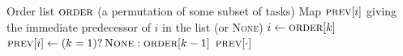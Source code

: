 \begin{algorithm}[!htbp]
\caption{BuildPrevMap (Helper for hard ordered schedules)}
\label{alg:build_prev_map}
\scriptsize
\begin{algorithmic}[1]
\Require Order list $\textsc{order}$ (a permutation of some subset of tasks)
\Ensure Map $\textsc{prev}[i]$ giving the immediate predecessor of $i$ in the list (or \textsc{None})
    \State $i\gets \textsc{order}[k]$
    \State $\textsc{prev}[i]\gets (k=1)?\,\textsc{None}:\textsc{order}[k-1]$
\EndFor
\State \Return $\textsc{prev}[\cdot]$
\end{algorithmic}
\end{algorithm}

